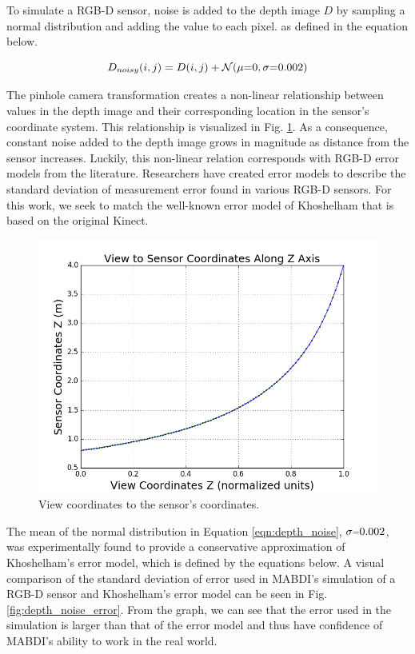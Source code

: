 To simulate a RGB-D sensor, noise is added to the depth image $D$ by
sampling a normal distribution and adding the value to each pixel. as defined in
the equation below.

\begin{equation}
D_{noisy}(i,j) = D(i,j) + \mathcal{N} (\mu\mathsmaller{=}0, \sigma\mathsmaller{=}0.002)
\label{eqn:depth_noise}
\end{equation}

The pinhole camera transformation creates a non-linear relationship between
values in the depth image and their corresponding location in the sensor's
coordinate system. This relationship is visualized in Fig.
\ref{fig:depth_view_to_sensor}. As a consequence, constant noise added to the
depth image grows in magnitude as distance from the sensor increases. Luckily,
this non-linear relation corresponds with RGB-D error models from the
literature. Researchers have created error models to describe the standard
deviation of measurement error found in various RGB-D sensors. For this work, we
seek to match the well-known error model of Khoshelham \cite{Khoshelham2012}
that is based on the original Kinect.

\begin{figure}[h]%
\centering
  \includegraphics[width=.70\textwidth]{figures/depth_view_to_sensor.png}
  \caption{View coordinates to the sensor's coordinates.}
  \label{fig:depth_view_to_sensor}
\end{figure}

The mean of the normal distribution in Equation \ref{eqn:depth_noise},
$\sigma\mathsmaller{=}0.002$, was experimentally found to provide a conservative
approximation of Khoshelham's error model, which is defined by the equations
below. A visual comparison of the standard deviation of error used in MABDI's
simulation of a RGB-D sensor and Khoshelham's error model can be seen in Fig.
\ref{fig:depth_noise_error}. From the graph, we can see that the error used in
the simulation is larger than that of the error model and thus have confidence
of MABDI's ability to work in the real world.

